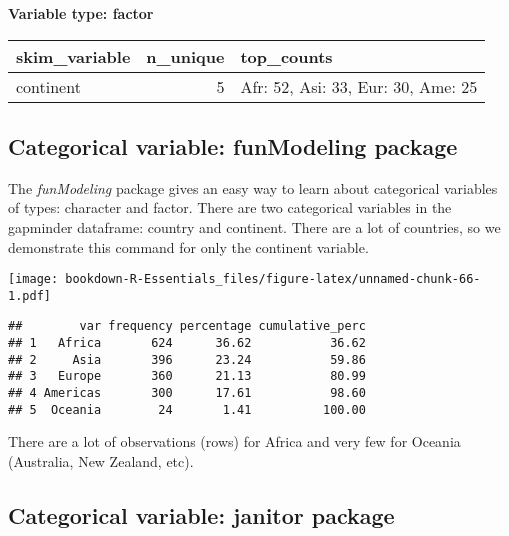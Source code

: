 \documentclass[]{book}
\newenvironment{Shaded}{\begin{snugshade}}{\end{snugshade}}
\newcommand{\KeywordTok}[1]{\textcolor[rgb]{0.13,0.29,0.53}{\textbf{#1}}}
\newcommand{\CommentTok}[1]{\textcolor[rgb]{0.56,0.35,0.01}{\textit{#1}}}
\newcommand{\OperatorTok}[1]{\textcolor[rgb]{0.81,0.36,0.00}{\textbf{#1}}}
\newcommand{\NormalTok}[1]{#1}
\begin{document}
\textbf{Variable type: factor}

\begin{tabular}{l|r|l}
\hline
skim\_variable & n\_unique & top\_counts\\
\hline
continent & 5 & Afr: 52, Asi: 33, Eur: 30, Ame: 25\\
\hline
\end{tabular}

\subsection{Categorical variable: funModeling
package}\label{categorical-variable-funmodeling-package}

The \emph{funModeling} package gives an easy way to learn about
categorical variables of types: character and factor. There are two
categorical variables in the gapminder dataframe: country and continent.
There are a lot of countries, so we demonstrate this command for only
the continent variable.

\begin{Shaded}
\end{Shaded}

\texttt{[image: bookdown-R-Essentials\_files/figure-latex/unnamed-chunk-66-1.pdf]}

\begin{verbatim}
##        var frequency percentage cumulative_perc
## 1   Africa       624      36.62           36.62
## 2     Asia       396      23.24           59.86
## 3   Europe       360      21.13           80.99
## 4 Americas       300      17.61           98.60
## 5  Oceania        24       1.41          100.00
\end{verbatim}

There are a lot of observations (rows) for Africa and very few for
Oceania (Australia, New Zealand, etc).

\subsection{Categorical variable: janitor
package}\label{categorical-variable-janitor-package}
\end{document}
